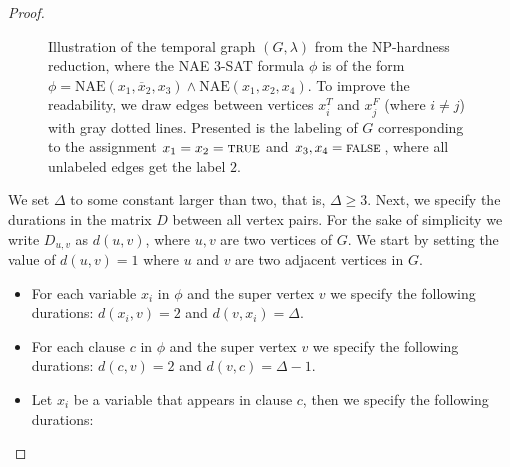 \documentclass[a4paper,UKenglish,cleveref, autoref, thm-restate, anonymous]{lipics-v2021}
\begin{document}
\begin{proof}
%
\begin{figure}[t]
	\noindent
\caption{Illustration of the temporal graph $(G,\lambda)$ from the NP-hardness reduction, 
	where the NAE 3-SAT formula $\phi$ is of the form $\phi = \text{NAE}(x_1, \overline{x}_2, x_3) \wedge \text{NAE}(x_1, x_2, x_4)$.
To improve the readability, we draw edges between vertices $x_i^T$ and $x_j^F$ (where $i \neq j$) with gray dotted lines.
Presented is the labeling of $G$ corresponding to the assignment $x_1=x_2=\textsc{true}$ and $x_3,x_4=\textsc{false}$,
where all unlabeled edges get the label $2$.
}\label{fig:NP-example}
\end{figure}
%
We set $\Delta$ to some constant larger than two, that is, $\Delta\ge 3$. Next, we specify the durations in the matrix $D$ between all vertex pairs.
For the sake of simplicity we write $D_{u,v}$ as $d(u,v)$,
where $u,v$ are two vertices of $G$. 
We start by setting the value of $d(u,v) = 1$ where $u$ and $v$ are two adjacent vertices in $G$.
\begin{itemize}
    \item For each variable $x_i$ in $\phi$ and the super vertex $v$
    we specify the following durations:
    $d(x_i,v)=2$ and $d(v,x_i)= \Delta $. %
    \item For each clause $c$ in $\phi$ and the super vertex $v$
    we specify the following durations:
    $d(c,v)=2$ and $d(v,c)= \Delta - 1$.
    \item Let $x_i$ be a variable that appears in clause $c$, then  we specify the following durations:

\end{itemize}
\end{proof}
\end{document}
